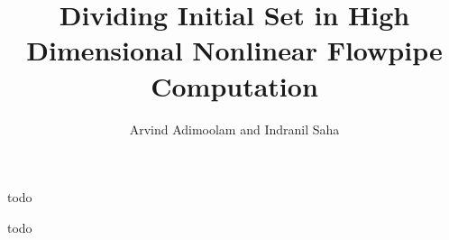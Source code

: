 

\title{Dividing Initial Set in High Dimensional Nonlinear Flowpipe Computation}
\author{Arvind Adimoolam and Indranil Saha}
%
\date{}
%

\maketitle

\pagebreak

todo

\pagebreak

todo





